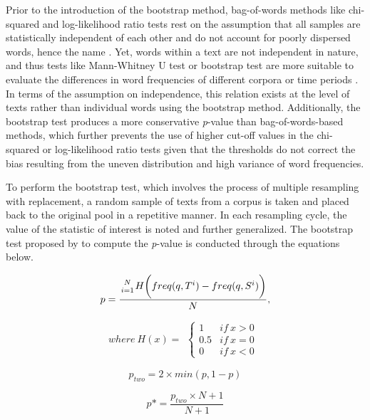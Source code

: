 Prior to the introduction of the bootstrap method, bag-of-words methods like chi-squared and log-likelihood ratio tests rest on the assumption that all samples are statistically independent of each other and do not account for poorly dispersed words, hence the name \parencite{lijffijt2016bootstrap}. Yet, words within a text are not independent in nature, and thus tests like Mann-Whitney U test or bootstrap test are more suitable to evaluate the differences in word frequencies of different corpora or time periods \parencite{lijffijt2016bootstrap,brezina2018statistics}. In terms of the assumption on independence, this relation exists at the level of texts rather than individual words using the bootstrap method. Additionally, the bootstrap test produces a more conservative \textit{p}-value than bag-of-words-based methods, which further prevents the use of higher cut-off values in the chi-squared or log-likelihood ratio tests given that the thresholds do not correct the bias resulting from the uneven distribution and high variance of word frequencies.

To perform the bootstrap test, which involves the process of multiple resampling with replacement, a random sample of texts from a corpus is taken and placed back to the original pool in a repetitive manner. In each resampling cycle, the value of the statistic of interest is noted and further generalized. The bootstrap test proposed by \textcite{lijffijt2016bootstrap} to compute the \textit{p}-value is conducted through the equations below.

\begin{equation}
  p = \frac{{N \atop i=1} H \bigg(freq(q,T^i) - freq(q,S^i)\bigg)}{N}{,}
\end{equation}

\begin{equation*}
  where\: H(x) =
  \begin{aligned}\begin{cases}
    1 & if\: x > 0 \\
    0.5 & if\: x = 0 \\
    0 & if \: x < 0
  \end{cases}\end{aligned}
\end{equation*}

\begin{equation}
  p_{two} = 2 \times min(p, 1-p)
\end{equation}

\begin{equation}
  p\ast = \frac{p_{two} \times N + 1}{N + 1}
\end{equation}

